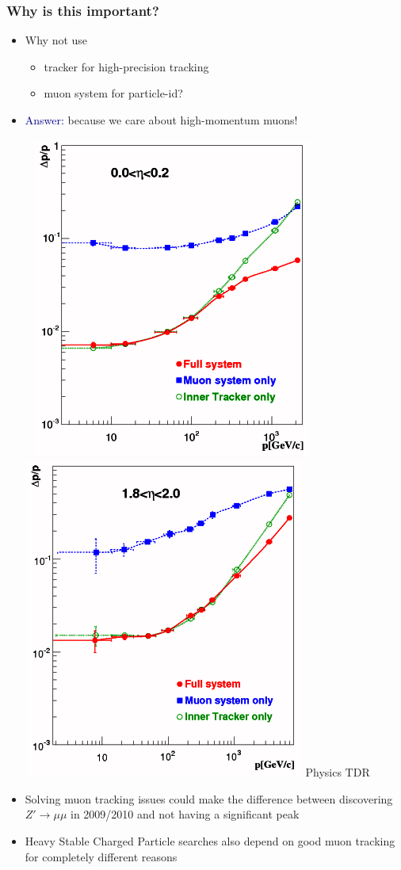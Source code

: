 \documentclass[compress]{beamer}
\begin{document}
\begin{frame}
\frametitle{Why is this important?}

\begin{itemize}
\item Why not use
\begin{itemize}
\item tracker for high-precision tracking
\item muon system for particle-id?
\end{itemize}

\item \textcolor{darkblue}{Answer:} because we care about high-momentum muons!

\mbox{ } \hfill \includegraphics[width=0.35\linewidth]{Figure_001-005-a.png} \includegraphics[width=0.35\linewidth]{Figure_001-005-b.png} \hfill {\tiny Physics TDR}

\item Solving muon tracking issues could make the difference between discovering $Z' \to \mu\mu$ in 2009/2010 and not having a significant peak

\item Heavy Stable Charged Particle searches also depend on good muon tracking for completely different reasons
\end{itemize}
\end{frame}
\end{document}
